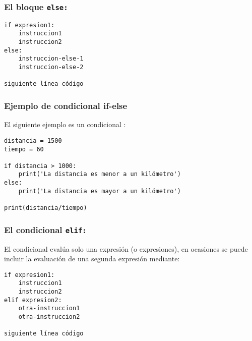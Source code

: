\documentclass[12pt]{beamer}
\begin{document}
\begin{frame}[fragile]
\frametitle{El bloque \texttt{else:}}
\begin{verbatim}
if expresion1:
    instruccion1
    instruccion2
else:
    instruccion-else-1
    instruccion-else-2

siguiente línea código
\end{verbatim}
\end{frame}
\begin{frame}[fragile]
\frametitle{Ejemplo de condicional if-else}
El siguiente ejemplo es un condicional :
\pause
\begin{lstlisting}[caption=La estructura condicional if-else]
distancia = 1500
tiempo = 60

if distancia > 1000:
    print('La distancia es menor a un kilómetro')
else:
    print('La distancia es mayor a un kilómetro')

print(distancia/tiempo)
\end{lstlisting}
\end{frame}
\begin{frame}[fragile]
\frametitle{El condicional \texttt{elif:}}
El condicional  evalúa solo una expresión (o expresiones), \pause en ocasiones se puede incluir la evaluación de una segunda expresión mediante:
\\
\bigskip
\pause
\begin{verbatim}
if expresion1:
    instruccion1
    instruccion2
elif expresion2:
    otra-instruccion1
    otra-instruccion2

siguiente línea código
\end{verbatim}
\end{frame}
\end{document}
